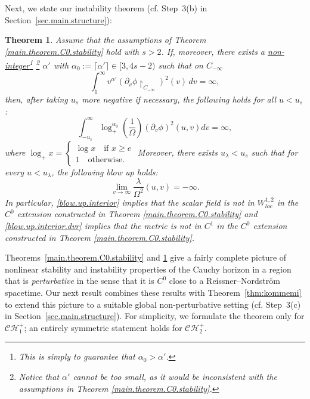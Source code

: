 \documentclass[10pt, reqno]{amsart}
\newtheorem{theorem}{Theorem}[section]
\theoremstyle{definition}
\theoremstyle{remark}
\numberwithin{equation}{section}
\newcommand{\rd}{\partial}
\newcommand{\0}{\emptyset}
\newcommand{\alp}{\alpha}
\newcommand{\Omg}{\Omega}
\newcommand{\calC}{\mathcal C}
\newcommand{\calH}{\mathcal H}
\newcommand{\f}{\frac}
\newcommand{\CH}{\calC \calH^{+}}		%
\begin{document}
Next, we state our instability theorem (cf. Step~3(b) in Section~\ref{sec.main.structure}):
\begin{theorem}\label{final.blow.up.step}
Assume that the assumptions of Theorem \ref{main.theorem.C0.stability} hold with $s>2$. If, moreover, there exists a \underline{non-integer}\footnote{This is simply to guarantee that $\alp_0>\alp'$.} \footnote{Notice that $\alp'$ cannot be too small, as it would be inconsistent with the assumptions in Theorem \ref{main.theorem.C0.stability}.} $\alpha'$ with $\alp_0:=\lceil \alp' \rceil\in [3, 4s-2)$ such that on $C_{-\infty}$
\begin{equation}\label{final.blow.up.step.assumption}
\int_{1}^\infty v^{\alpha'}(\rd_v\phi\restriction_{C_{-\infty}})^2(v)\, dv =\infty,
\end{equation}
then, after taking $u_s$ more negative if necessary, the following holds for all $u<u_s$:
\begin{equation}\label{blow.up.interior}
\int_{-u_s}^{\infty} \log_{+}^{\alpha_0}(\f 1{\Omg}) (\rd_v\phi)^2(u,v) dv=\infty,
\end{equation}
where $\log_+ x=\begin{cases}
\log x\quad\mbox{if }x\geq e\\
1\quad\mbox{otherwise}.
\end{cases}
$
Moreover, there exists $u_\lambda<u_s$ such that for every $u<u_\lambda$, the following blow up holds:
\begin{equation}\label{blow.up.interior.dvr}
\lim_{v\to \infty}\f{\lambda}{\Omg^2}(u,v)=-\infty.
\end{equation}
In particular, \eqref{blow.up.interior} implies that the scalar field is not in $W^{1,2}_{loc}$ in the $C^0$ extension constructed in Theorem \ref{main.theorem.C0.stability} and \eqref{blow.up.interior.dvr} implies that the metric is not in $C^1$ in the $C^0$ extension constructed in Theorem \ref{main.theorem.C0.stability}.
\end{theorem}

Theorems~\ref{main.theorem.C0.stability} and \ref{final.blow.up.step} give a fairly complete picture of nonlinear stability and instability properties of the Cauchy horizon in a region that is \emph{perturbative} in the sense that it is $C^{0}$ close to a Reissner--Nordstr\"om spacetime. Our next result combines these results with Theorem~\ref{thm:kommemi} to extend this picture to a suitable global non-perturbative setting (cf. Step~3(c) in Section~\ref{sec.main.structure}). For simplicity, we formulate the theorem only for $\CH_{1}$; an entirely symmetric statement holds for $\CH_{2}$.
\end{document}
